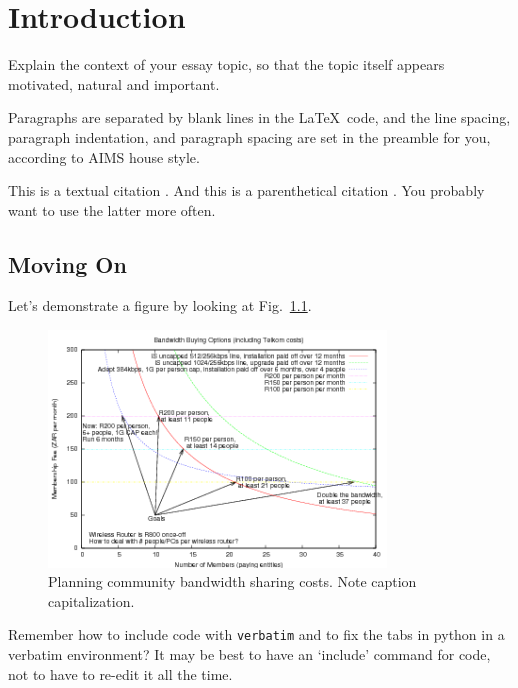 \chapter{Introduction}

Explain the context of your essay topic, so that the
topic itself appears motivated, natural and important.

Paragraphs are separated by blank lines in the \LaTeX\ code, 
and the line spacing, paragraph indentation,
and paragraph spacing are set in the preamble for you, 
according to AIMS house style.

This is a textual citation \citet{shannon44}. And this is a parenthetical citation \citep{shannon44}. You probably want to use the latter more often.

\section{Moving On}
Let's demonstrate a figure by looking at Fig.~\ref{bandwidth}. 

\begin{figure}[!h]
\centering 
\includegraphics[width=0.8\textwidth]{images/bandwidth-colour.png}
\caption{Planning community bandwidth sharing costs. 
  Note caption capitalization.}
\label{bandwidth} 
\end{figure}

Remember how to include code with {\tt verbatim} 
and to fix the tabs in {\sf python} in a verbatim environment? 
It may be best to have an `include' command for code, 
not to have to re-edit it all the time.


